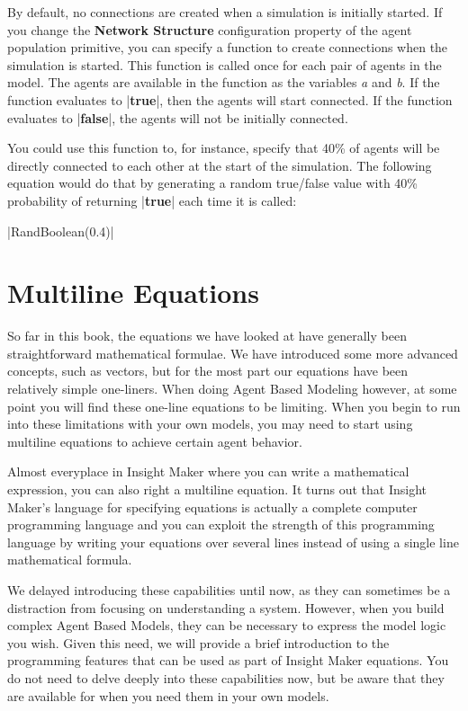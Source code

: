 \documentclass[]{memoir}
\newcommand{\KeywordTok}[1]{\textcolor[rgb]{0.00,0.44,0.13}{\textbf{{#1}}}}
\newcommand{\FloatTok}[1]{\textcolor[rgb]{0.25,0.63,0.44}{{#1}}}
\newcommand{\FunctionTok}[1]{\textcolor[rgb]{0.02,0.16,0.49}{{#1}}}
\newcommand{\NormalTok}[1]{{#1}}
\renewcommand{\a}[1]{\textbf{#1}}
\begin{document}
By default, no connections are created when a simulation is initially
started. If you change the \a{Network Structure} configuration property
of the agent population primitive, you can specify a function to create
connections when the simulation is started. This function is called once
for each pair of agents in the model. The agents are available in the
function as the variables \emph{a} and \emph{b}. If the function
evaluates to |\KeywordTok{true}|, then the agents will start connected.
If the function evaluates to |\KeywordTok{false}|, the agents will not
be initially connected.

You could use this function to, for instance, specify that 40\% of
agents will be directly connected to each other at the start of the
simulation. The following equation would do that by generating a random
true/false value with 40\% probability of returning |\KeywordTok{true}|
each time it is called:

|\FunctionTok{RandBoolean}\NormalTok{(}\FloatTok{0.4}\NormalTok{)}|

\section{Multiline Equations}

So far in this book, the equations we have looked at have generally been
straightforward mathematical formulae. We have introduced some more
advanced concepts, such as vectors, but for the most part our equations
have been relatively simple one-liners. When doing Agent Based Modeling
however, at some point you will find these one-line equations to be
limiting. When you begin to run into these limitations with your own
models, you may need to start using multiline equations to achieve
certain agent behavior.

Almost everyplace in Insight Maker where you can write a mathematical
expression, you can also right a multiline equation. It turns out that
Insight Maker's language for specifying equations is actually a complete
computer programming language and you can exploit the strength of this
programming language by writing your equations over several lines
instead of using a single line mathematical formula.

We delayed introducing these capabilities until now, as they can
sometimes be a distraction from focusing on understanding a system.
However, when you build complex Agent Based Models, they can be
necessary to express the model logic you wish. Given this need, we will
provide a brief introduction to the programming features that can be
used as part of Insight Maker equations. You do not need to delve deeply
into these capabilities now, but be aware that they are available for
when you need them in your own models.
\end{document}
